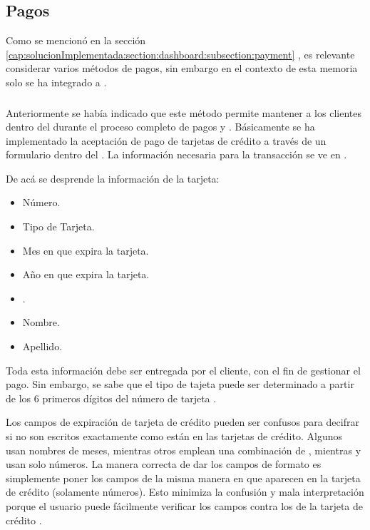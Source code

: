 \subsection{Pagos}\label{chapter:solucionimplementada:section:payment}
	
	Como se mencionó en la sección \ref{cap:solucionImplementada:section:dashboard:subsection:payment} , es relevante considerar varios métodos de pagos, sin embargo en el contexto de esta memoria solo se ha integrado a \PPPaymentProNAME.


	\subsubsection{\PPPaymentProNAME}
		Anteriormente se había indicado que este método permite mantener a los clientes dentro del \websiteINT durante el proceso completo de pagos y \checkoutCOM. Básicamente se ha implementado la aceptación de pago de tarjetas de crédito a través de un formulario dentro del \websiteINT. La información necesaria para la transacción se ve en .

		

		De acá se desprende la información de la tarjeta:

		\begin{itemize}
			\item Número.
			\item Tipo de Tarjeta.
			\item Mes en que expira la tarjeta.
			\item Año en que expira la tarjeta.
			\item \cvvTWOCOM.
			\item Nombre.
			\item Apellido.
		\end{itemize} 

		Toda esta información debe ser entregada por el cliente, con el fin de gestionar el pago. Sin embargo, se sabe que el tipo de tajeta puede ser determinado a partir de los 6 primeros dígitos del número de tarjeta \cite{online_investopedia_meaning_IIN}. 

		Los campos de expiración de tarjeta de crédito pueden ser confusos para decifrar si no son escritos exactamente como están en las tarjetas de crédito. Algunos \websitesINT usan nombres de meses, mientras otros emplean una combinación de \nombreNumeroCPT, mientras y usan solo números. La manera correcta de dar los campos de formato es simplemente poner los campos de la misma manera en que aparecen en la tarjeta de crédito (solamente números). Esto minimiza la confusión y mala interpretación porque el usuario puede fácilmente verificar  los campos contra los de la tarjeta de crédito \cite{online_official_smashingmagazine_fundamental_guidelines_checkout_design}.

